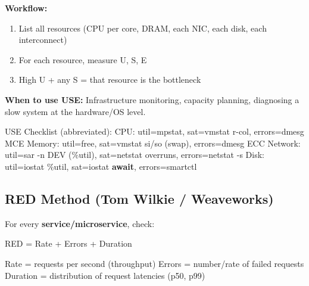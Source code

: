 \documentclass[11pt]{article}
\providecommand{\tightlist}{\setlength{\itemsep}{1pt}\setlength{\parskip}{0pt}}
\newenvironment{Shaded}{\begin{snugshade}}{\end{snugshade}}
\newcommand{\ControlFlowTok}[1]{\textcolor[rgb]{0.99,0.74,0.29}{\textbf{#1}}}
\newcommand{\NormalTok}[1]{\textcolor[rgb]{0.81,0.81,0.76}{#1}}
\newcommand{\OperatorTok}[1]{\textcolor[rgb]{0.81,0.81,0.76}{#1}}
\begin{document}
\textbf{Workflow:}

\begin{enumerate}
\def\labelenumi{\arabic{enumi}.}
\tightlist
\item
  List all resources (CPU per core, DRAM, each NIC, each disk, each interconnect)
\item
  For each resource, measure U, S, E
\item
  High U + any S = that resource is the bottleneck
\end{enumerate}

\textbf{When to use USE:} Infrastructure monitoring, capacity planning, diagnosing a slow system at the hardware/OS level.


\begin{Shaded}
\begin{Highlighting}[]
\NormalTok{USE Checklist (abbreviated):}
\NormalTok{  CPU:     util}\OperatorTok{=}\NormalTok{mpstat, sat}\OperatorTok{=}\NormalTok{vmstat r}\OperatorTok{{-}}\NormalTok{col, errors}\OperatorTok{=}\NormalTok{dmesg MCE}
\NormalTok{  Memory:  util}\OperatorTok{=}\NormalTok{free, sat}\OperatorTok{=}\NormalTok{vmstat si}\OperatorTok{/}\NormalTok{so (swap), errors}\OperatorTok{=}\NormalTok{dmesg ECC}
\NormalTok{  Network: util}\OperatorTok{=}\NormalTok{sar }\OperatorTok{{-}}\NormalTok{n DEV (}\OperatorTok{\%}\NormalTok{util), sat}\OperatorTok{=}\NormalTok{netstat overruns, errors}\OperatorTok{=}\NormalTok{netstat }\OperatorTok{{-}}\NormalTok{s}
\NormalTok{  Disk:    util}\OperatorTok{=}\NormalTok{iostat }\OperatorTok{\%}\NormalTok{util, sat}\OperatorTok{=}\NormalTok{iostat }\ControlFlowTok{await}\NormalTok{, errors}\OperatorTok{=}\NormalTok{smartctl}
\end{Highlighting}
\end{Shaded}

\subsection{RED Method (Tom Wilkie / Weaveworks)}\label{red-method-tom-wilkie--weaveworks}

For every \textbf{service/microservice}, check:


\begin{Shaded}
\begin{Highlighting}[]
\NormalTok{RED }\OperatorTok{=}\NormalTok{ Rate }\OperatorTok{+}\NormalTok{ Errors }\OperatorTok{+}\NormalTok{ Duration}

\NormalTok{Rate     }\OperatorTok{=}\NormalTok{ requests per second (throughput)}
\NormalTok{Errors   }\OperatorTok{=}\NormalTok{ number}\OperatorTok{/}\NormalTok{rate of failed requests}
\NormalTok{Duration }\OperatorTok{=}\NormalTok{ distribution of request latencies (p50, p99)}
\end{Highlighting}
\end{Shaded}
\end{document}
